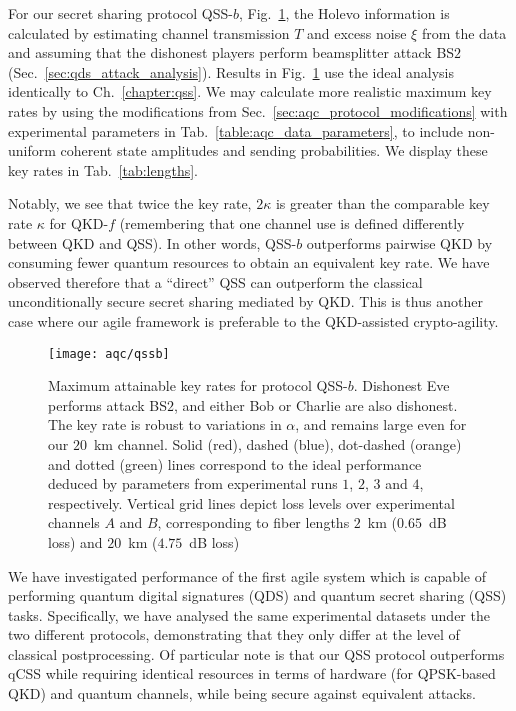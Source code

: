 For our secret sharing protocol QSS-$b$, Fig.~\ref{fig:aqc_qssb}, the Holevo information is calculated by estimating channel transmission $T$ and excess noise $\xi$ from the data and assuming that the dishonest players perform beamsplitter attack BS$2$ (Sec.~\ref{sec:qds_attack_analysis}). Results in Fig.~\ref{fig:aqc_qssb} use the ideal analysis identically to Ch.~\ref{chapter:qss}. We may calculate more realistic maximum key rates by using the modifications from Sec.~\ref{sec:aqc_protocol_modifications} with experimental parameters in Tab.~\ref{table:aqc_data_parameters}, to include non-uniform coherent state amplitudes and sending probabilities. We display these key rates in Tab.~\ref{tab:lengths}.

Notably, we see that twice the key rate, $2 \kappa$ is greater than the comparable key rate $\kappa$ for QKD-$f$ (remembering that one channel use is defined differently between QKD and QSS). In other words, QSS-$b$ outperforms pairwise QKD by consuming fewer quantum resources to obtain an equivalent key rate. We have observed therefore that a ``direct'' QSS can outperform the classical unconditionally secure secret sharing mediated by QKD. This is thus another case where our agile framework is preferable to the QKD-assisted crypto-agility.

\begin{figure}[htp]
\captionsetup{width=\linewidth}
\centering
\texttt{[image: aqc/qssb]}
\caption{\label{fig:aqc_qssb} Maximum attainable key rates for protocol QSS-$b$. Dishonest Eve performs attack BS$2$, and either Bob or Charlie are also dishonest. The key rate is robust to variations in $\alpha$, and remains large even for our $20$~km channel. Solid (red), dashed (blue), dot-dashed (orange) and dotted (green) lines correspond to the ideal performance deduced by parameters from experimental runs $1$, $2$, $3$ and $4$, respectively. Vertical grid lines depict loss levels over experimental channels $A$ and $B$, corresponding to fiber lengths $2$~km ($0.65$~dB loss) and $20$~km ($4.75$~dB loss)}
\end{figure}

We have investigated performance of the first agile system \systemB \; which is capable of performing quantum digital signatures (QDS) and quantum secret sharing (QSS) tasks. Specifically, we have analysed the same experimental datasets under the two different protocols, demonstrating that they only differ at the level of classical postprocessing. Of particular note is that our QSS protocol outperforms qCSS while requiring identical resources in terms of hardware (for QPSK-based QKD) and quantum channels, while being secure against equivalent attacks.



